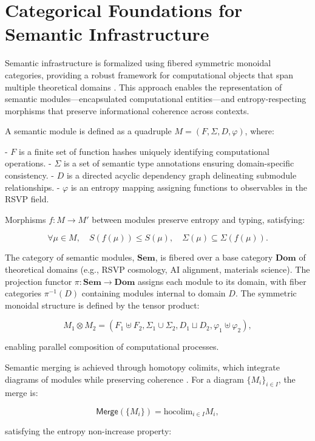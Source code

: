 \documentclass[12pt]{article}
\begin{document}
\section{Categorical Foundations for Semantic Infrastructure}
\label{sec:categorical-foundations}

Semantic infrastructure is formalized using fibered symmetric monoidal categories, providing a robust framework for computational objects that span multiple theoretical domains \citep{BaezStay2010, MacLane1998}. This approach enables the representation of semantic modules—encapsulated computational entities—and entropy-respecting morphisms that preserve informational coherence across contexts.

A semantic module is defined as a quadruple $ M = (F, \Sigma, D, \varphi) $, where:

- $ F $ is a finite set of function hashes uniquely identifying computational operations.
- $ \Sigma $ is a set of semantic type annotations ensuring domain-specific consistency.
- $ D $ is a directed acyclic dependency graph delineating submodule relationships.
- $ \varphi $ is an entropy mapping assigning functions to observables in the RSVP field.

Morphisms $ f: M \to M' $ between modules preserve entropy and typing, satisfying:

\[ \forall \mu \in M, \quad S(f(\mu)) \leq S(\mu), \quad \Sigma(\mu) \subseteq \Sigma(f(\mu)). \]

The category of semantic modules, $ \mathbf{Sem} $, is fibered over a base category $ \mathbf{Dom} $ of theoretical domains (e.g., RSVP cosmology, AI alignment, materials science). The projection functor $ \pi: \mathbf{Sem} \to \mathbf{Dom} $ assigns each module to its domain, with fiber categories $ \pi^{-1}(D) $ containing modules internal to domain $ D $. The symmetric monoidal structure is defined by the tensor product:

\[ M_1 \otimes M_2 = (F_1 \uplus F_2, \Sigma_1 \cup \Sigma_2, D_1 \sqcup D_2, \varphi_1 \uplus \varphi_2), \]

enabling parallel composition of computational processes.

Semantic merging is achieved through homotopy colimits, which integrate diagrams of modules while preserving coherence \citep{Lurie2009, Riehl2016}. For a diagram $ \{M_i\}_{i \in I} $, the merge is:

\[ \mathsf{Merge}(\{M_i\}) = \mathrm{hocolim}_{i \in I} M_i, \]

satisfying the entropy non-increase property:
\end{document}
